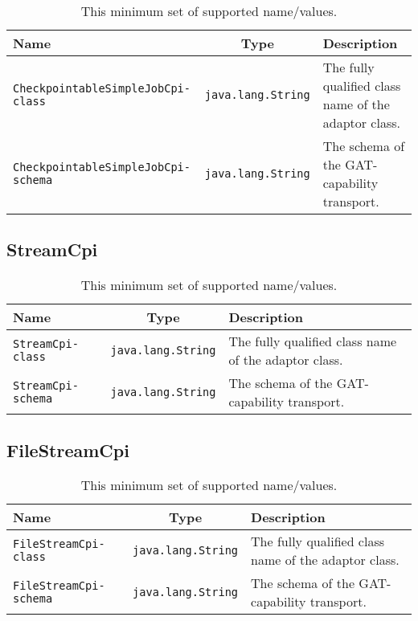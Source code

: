 \documentclass[$Date: 2003/06/26 19:29:31 $]{glabarticle}
\begin{document}
\begin{table}[htp]
\begin{center}
\begin{tabular}{|l|c|l|} \hline
Name & Type & Description \\ \hline\hline
\verb"CheckpointableSimpleJobCpi-class" & \verb"java.lang.String" & The fully qualified class name of the adaptor class. \\ \hline
\verb"CheckpointableSimpleJobCpi-schema" & \verb"java.lang.String" & The schema of the GAT-capability transport. \\ \hline
\end{tabular}
\end{center}
\caption{This minimum set of supported name/values.}
\label{table:SRD}
\end{table}

\newpage

\subsection{StreamCpi}

\begin{table}[htp]
\begin{center}
\begin{tabular}{|l|c|l|} \hline
Name & Type & Description \\ \hline\hline
\verb"StreamCpi-class" & \verb"java.lang.String" & The fully qualified class name of the adaptor class. \\ \hline
\verb"StreamCpi-schema" & \verb"java.lang.String" & The schema of the GAT-capability transport. \\ \hline
\end{tabular}
\end{center}
\caption{This minimum set of supported name/values.}
\label{table:SRD}
\end{table}

\newpage

\subsection{FileStreamCpi}

\begin{table}[htp]
\begin{center}
\begin{tabular}{|l|c|l|} \hline
Name & Type & Description \\ \hline\hline
\verb"FileStreamCpi-class" & \verb"java.lang.String" & The fully qualified class name of the adaptor class. \\ \hline
\verb"FileStreamCpi-schema" & \verb"java.lang.String" & The schema of the GAT-capability transport. \\ \hline
\end{tabular}
\end{center}
\caption{This minimum set of supported name/values.}
\label{table:SRD}
\end{table}
\end{document}
